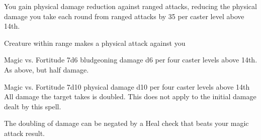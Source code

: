 \begin{spellheader}
    \spelldur{\durshort \dismissable}
\end{spellheader}
\begin{spelleffects}
    \spelleffect You gain physical damage reduction against ranged attacks, reducing the physical damage you take each round from ranged attacks by 35  per caster level above 14th.
    \begin{spelltrigger}{Creature within range makes a physical attack against you}
        \begin{spellattack}{Magic vs. Fortitude}
            \spellsuccess 7d6 bludgeoning damage \add d6 per four caster levels above 14th.
            \spellfailure As above, but half damage.
        \end{spellattack}
    \end{spelltrigger}
\end{spelleffects}
\begin{spellfooter}

\end{spellfooter}

\begin{spellheader}
    \spellrng{\rngclose}
    \spelldur{\durshort}
\end{spellheader}
\begin{spelleffects}
    \begin{spellattack}{Magic vs. Fortitude}
        \spelleffect 7d10 physical damage \add d10 per four caster levels above 14th
        \spellsuccess All damage the target takes is doubled. This does not apply to the initial damage dealt by this spell.
    \end{spellattack}
\end{spelleffects}
\begin{spellfooter}
    \spellnotes The doubling of damage can be negated by a Heal check that beats your magic attack result.
\end{spellfooter}

